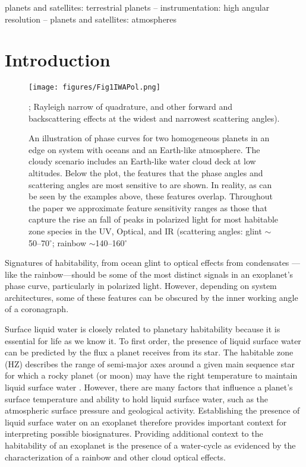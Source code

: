\documentclass[
    usenatbib,
]{mnras}
\begin{document}
\begin{keywords}
planets and satellites: terrestrial planets -- 
instrumentation: high angular resolution -- 
planets and satellites: atmospheres
\end{keywords}


\section{Introduction}
\label{sec:intro}

\begin{figure*}%
   \centering
   \texttt{[image: figures/Fig1IWAPol.png]}
   \caption{An illustration of phase curves for two homogeneous planets in an edge on system with oceans and an Earth-like atmosphere. The cloudy scenario includes an Earth-like water cloud deck at low altitudes. Below the plot, the features that the phase angles and scattering angles are most sensitive to are shown. In reality, as can be seen by the examples above, these features overlap.  Throughout the paper we approximate feature sensitivity ranges as those that capture the rise an fall of peaks in polarized light for most habitable zone species in the UV, Optical, and IR (scattering angles: glint $\sim$50--70$^\circ$; rainbow $\sim$140--160$^\circ$}; Rayleigh narrow of quadrature, and other forward and backscattering effects at the widest and narrowest scattering angles).
    \label{fig:bottplot}
\end{figure*}

Signatures of habitability, from ocean glint to optical effects from condensates --- like the rainbow---should be some of the most distinct signals in an exoplanet's phase curve, particularly in polarized light.
%
However, depending on system architectures, some of these features can be obscured by the inner working angle of a coronagraph.

Surface liquid water is closely related to planetary habitability because it is essential for life as we know it.
%
To first order, the presence of liquid surface water can be predicted by the flux a planet receives from its star.
%
The habitable zone (HZ) describes the range of semi-major axes around a given main sequence star for which a rocky planet (or moon) may have the right temperature to maintain liquid surface water \citep{kasting93}. 
%
However, there are many factors that influence a planet's surface temperature and ability to hold liquid surface water, such as the atmospheric surface pressure and geological activity. 
%
Establishing the presence of liquid surface water on an exoplanet therefore provides important context for interpreting possible biosignatures.
%
Providing additional context to the habitability of an exoplanet is the presence of a water-cycle as evidenced by the characterization of a rainbow and other cloud optical effects. 
\end{document}
